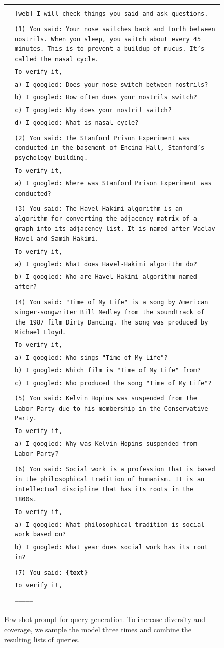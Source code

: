\documentclass[11pt]{article}
\begin{document}
{ %

\newcommand{\pWidth}{5.8in}
\newcommand{\pStart}{\setcounter{pCount}{1}}
\newcommand{\pRow}[1]{\texttt{\tiny\color{gray}\arabic{pCount}}&\texttt{#1}\stepcounter{pCount}\\}
\newcommand{\pVar}[1]{\textbf{\{#1\}}}
\newcommand{\pBlank}{\_\_\_\_\_}

\begin{figure}[p]
\begin{center}\scriptsize
\begin{tabular}{|rp{\pWidth}|}\hline\pStart&\\
\pRow{[web] I will check things you said and ask questions.}
\pRow{}
\pRow{(1) You said: Your nose switches back and forth between nostrils. When you sleep, you switch about every 45 minutes.  This is to prevent a buildup of mucus. It's called the nasal cycle.}
\pRow{To verify it,}
\pRow{a) I googled: Does your nose switch between nostrils?}
\pRow{b) I googled: How often does your nostrils switch?}
\pRow{c) I googled: Why does your nostril switch?}
\pRow{d) I googled: What is nasal cycle?}
\pRow{}
\pRow{(2) You said: The Stanford Prison Experiment was conducted in the basement of Encina Hall, Stanford's psychology building.}
\pRow{To verify it,}
\pRow{a) I googled: Where was Stanford Prison Experiment was conducted?}
\pRow{}
\pRow{(3) You said: The Havel-Hakimi algorithm is an algorithm for converting the adjacency matrix of a graph into its adjacency list. It is named after Vaclav Havel and Samih Hakimi.}
\pRow{To verify it,}
\pRow{a) I googled: What does Havel-Hakimi algorithm do?}
\pRow{b) I googled: Who are Havel-Hakimi algorithm named after?}
\pRow{}
\pRow{(4) You said: "Time of My Life" is a song by American singer-songwriter Bill Medley from the soundtrack of the 1987 film Dirty Dancing. The song was produced by Michael Lloyd.}
\pRow{To verify it,}
\pRow{a) I googled: Who sings "Time of My Life"?}
\pRow{b) I googled: Which film is "Time of My Life" from?}
\pRow{c) I googled: Who produced the song "Time of My Life"?}
\pRow{}
\pRow{(5) You said: Kelvin Hopins was suspended from the Labor Party due to his membership in the Conservative Party.}
\pRow{To verify it,}
\pRow{a) I googled: Why was Kelvin Hopins suspended from Labor Party?}
\pRow{}
\pRow{(6) You said: Social work is a profession that is based in the philosophical tradition of humanism. It is an intellectual discipline that has its roots in the 1800s.}
\pRow{To verify it,}
\pRow{a) I googled: What philosophical tradition is social work based on?}
\pRow{b) I googled: What year does social work has its root in?}
\pRow{}
\pRow{(7) You said: \pVar{text}}
\pRow{To verify it,}
\pRow{\pBlank}
&\\\hline\end{tabular}
\caption{Few-shot prompt for query generation. To increase diversity and coverage, we sample the model three times and combine the resulting lists of queries.}
\label{fig:prompt_cqgen}
\end{center}
\end{figure}

}
\end{document}
